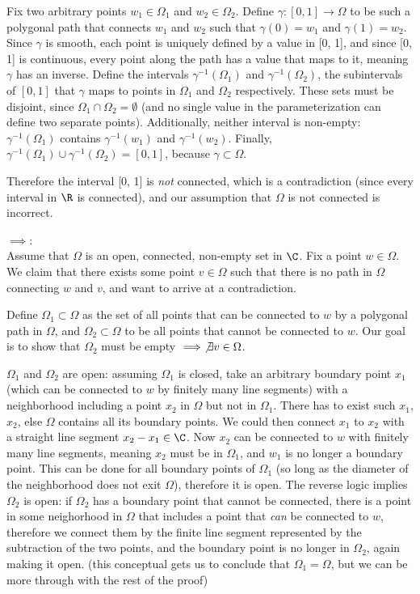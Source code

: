 \documentclass{article}
\begin{document}
Fix two arbitrary points $w_1 \in \Omega_1$ and $w_2 \in \Omega_2$.  Define $\gamma:[0, 1] \to \Omega$ to be such a polygonal path that connects $w_1$ and $w_2$ such that $\gamma(0) = w_1$ and $\gamma(1) = w_2$. Since $\gamma$ is smooth, each point is uniquely defined by a value in [0, 1], and since [0, 1] is continuous, every point along the path has a value that maps to it, meaning $\gamma$ has an inverse. Define the intervals $\gamma^{-1}(\Omega_1)$ and $\gamma^{-1}(\Omega_2)$, the subintervals of $[0, 1]$ that $\gamma$ maps to points in $\Omega_1$ and $\Omega_2$ respectively. These sets must be disjoint, since $\Omega_1 \cap \Omega_2 = \emptyset$ (and no single value in the parameterization can define two separate points). Additionally, neither interval is non-empty: $\gamma^{-1}(\Omega_1)$ contains $\gamma^{-1}(w_1)$ and $\gamma^{-1}(w_2)$. Finally, $\gamma^{-1}(\Omega_1) \cup \gamma^{-1}(\Omega_2) = [0, 1]$, because $\gamma \subset \Omega$. 

Therefore the interval [0, 1] is \emph{not} connected, which is a contradiction (since every interval in $\R$ is connected), and our assumption that $\Omega$ is not connected is incorrect.

$\implies$: \\
Assume that $\Omega$ is an open, connected, non-empty set in $\C$. Fix a point $w \in \Omega$. We claim that there exists some point $v\in \Omega$ such that there is no path in $\Omega$ connecting $w$ and $v$, and want to arrive at a contradiction.

Define $\Omega_1 \subset \Omega$ as the set of all points that can be connected to $w$ by a polygonal path in $\Omega$, and $\Omega_2 \subset \Omega$ to be all points that cannot be connected to $w$. Our goal is to show that $\Omega_2$ must be empty $\implies \not\exists v \in \Omega$.

$\Omega_1$ and $\Omega_2$ are open: assuming $\Omega_1$ is closed, take an arbitrary boundary point $x_1$ (which can be connected to $w$ by finitely many line segments) with a neighborhood including a point $x_2$ in $\Omega$ but not in $\Omega_1$. There has to exist such $x_1$, $x_2$, else $\Omega$ contains all its boundary points. We could then connect $x_1$ to $x_2$ with a straight line segment $x_2 - x_1 \in \C$. Now $x_2$ can be connected to $w$ with finitely many line segments, meaning $x_2$ must be in $\Omega_1$, and $w_1$ is no longer a boundary point. This can be done for all boundary points of $\Omega_1$ (so long as the diameter of the neighborhood does not exit $\Omega$), therefore it is open. The reverse logic implies $\Omega_2$ is open: if $\Omega_2$ has a boundary point that cannot be connected, there is a point in some neighorhood in $\Omega$ that includes a point that \emph{can} be connected to $w$, therefore we connect them by the finite line segment represented by the subtraction of the two points, and the boundary point is no longer in $\Omega_2$, again making it open. (this conceptual gets us to conclude that $\Omega_1 = \Omega$, but we can be more through with the rest of the proof)
\end{document}
